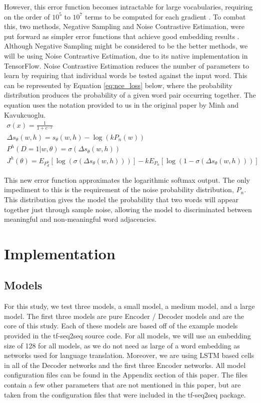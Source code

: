 \documentclass[pageno]{jpaper}
\begin{document}
However, this error function becomes intractable for large vocabularies, requiring on the order of $10^{5}$ to $10^{7}$ terms to be computed for each gradient \cite{mikolov:2013:2}.  To combat this, two methods, Negative Sampling and Noise Contrastive Estimation, were put forward as simpler error functions that achieve good embedding results \cite{mnih:2013}.  Although Negative Sampling might be considered to be the better methods, we will be using Noise Contrastive Estimation, due to its native implementation in TensorFlow.  Noise Contrastive Estimation reduces the number of parameters to learn by requiring that individual words be tested against the input word.  This can be represented by Equation \ref{eq:nce_loss} below, where the probability distribution produces the probability of a given word pair occurring together.  The equation uses the notation provided to us in the original paper by Minh and Kavukcuoglu.
\begin{subequations}
	\label{eq:nce_loss}
	\begin{gather}
	\sigma(x) = \frac{1}{1 + e^{-x}} \\
	\Delta s_{\theta}(w, h) = s_{\theta}(w, h) - \log(k P_{n}(w))\\
	P^{h}(D = 1 \vert w, \theta) = \sigma\left(\Delta s_{\theta}(w,h)\right)\\
	J^{h}(\theta) = E_{P^{h}_{d}}\left[\log \left(\sigma\left(\Delta s_{\theta}(w,h)\right)\right)\right] - kE_{P_{n}}\left[\log \left(1 - \sigma\left(\Delta s_{\theta}(w,h)\right)\right)\right]
	\end{gather}
\end{subequations}

This new error function approximates the logarithmic softmax output.  The only impediment to this is the requirement of the noise probability distribution, $P_{n}$.  This distribution gives the model the probability that two words will appear together just through sample noise, allowing the model to discriminated between meaningful and non-meaningful word adjacencies.

\section{Implementation}

\subsection{Models}
For this study, we test three models, a small model, a medium model, and a large model.  The first three models are pure Encoder / Decoder models and are the core of this study.  Each of these models are based off of the example models provided in the tf-seq2seq source code. For all models, we will use an embedding size of 128 for all models, as we do not need as large of a word embedding as networks used for language translation.  Moreover, we are using LSTM based cells in all of the Decoder networks and the first three Encoder networks.  All model configuration files can be found in the Appendix section of this paper.  The files contain a few other parameters that are not mentioned in this paper, but are taken from the configuration files that were included in the tf-seq2seq package.
\end{document}
